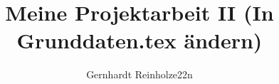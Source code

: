 
\title{Meine Projektarbeit II (In Grunddaten.tex ändern)}
\author{Gernhardt Reinholze22n}

\newcommand{\Kurs}{WI13C}
\newcommand{\guardian}{Prof. David R. Hart}
\newcommand{\company}{mongoloid GmBH}

